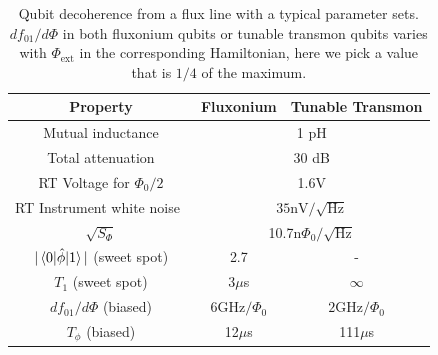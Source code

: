 \documentclass[a4paper,onecolumn,11pt,unpublished]{quantumarticle}
\newcommand{\Tphi}{T_{\phi}}
\newcommand{\Phiext}{\Phi_{\mathrm{ext}}}
\begin{document}
\begin{table}
  \centering
  \begin{tabular}{ccc}
    \hline\hline
    Property                                           & Fluxonium                                              & Tunable Transmon        \\
    \hline
    Mutual inductance                                  & \multicolumn{2}{c}{1 pH}                                                         \\
    Total attenuation                                  & \multicolumn{2}{c}{30 dB}                                                        \\
    RT Voltage for $\Phi_0/2$                          & \multicolumn{2}{c}{1.6V}                                                         \\
    RT Instrument white noise~\cite{ZurichAWGParameter} & \multicolumn{2}{c}{$35\mathrm{nV}/\sqrt{\mathrm{Hz}}$}                           \\
    $\sqrt{S_{\Phi}}$                                  & \multicolumn{2}{c}{10.7n$\Phi_0/\sqrt{\mathrm{Hz}}$}                             \\
    $|\mel{0}{\hat{\phi}}{1}|$ (sweet spot)            & 2.7                                                    & -                       \\
    $T_1$ (sweet spot)                                 & 3$\mu$s                                                & $\infty$                \\
    $df_{01} / d\Phi$ (biased)                         & $6 \mathrm{GHz}/\Phi_0$                                & $2 \mathrm{GHz}/\Phi_0$ \\
    $\Tphi$ (biased)                                   & 12$\mu$s                                               & 111$\mu$s               \\
    \hline
    \hline
  \end{tabular}
  \caption{Qubit decoherence from a flux line with a typical parameter sets. $df_{01}/d\Phi$ in both fluxonium qubits or tunable transmon qubits varies with $\Phiext$ in the corresponding Hamiltonian, here we pick a value that is $1/4$ of the maximum.}
  \label{table:decoherence_flux_line}
\end{table}
\end{document}
